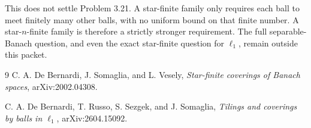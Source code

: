 \documentclass[11pt]{article}
\begin{document}
This does not settle Problem 3.21.  A star-finite family only requires each
ball to meet finitely many other balls, with no uniform bound on that finite
number.  A star-\(n\)-finite family is therefore a strictly stronger
requirement.  The full separable-Banach question, and even the exact
star-finite question for \(\ell_1\), remain outside this packet.

\begin{thebibliography}{9}
C. A. De Bernardi, J. Somaglia, and L. Vesely,
\emph{Star-finite coverings of Banach spaces},
arXiv:2002.04308.

C. A. De Bernardi, T. Russo, S. Sezgek, and J. Somaglia,
\emph{Tilings and coverings by balls in \(\ell_1\)},
arXiv:2604.15092.
\end{thebibliography}
\end{document}

